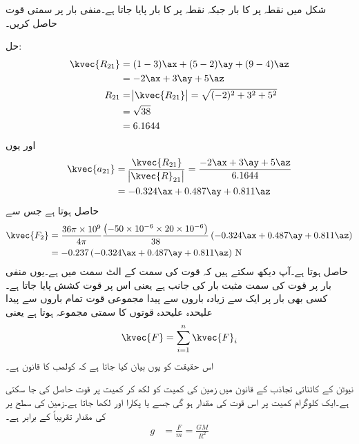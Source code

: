 شکل  میں نقطہ  پر  کا بار  جبکہ نقطہ  پر  کا بار  پایا جاتا ہے۔منفی بار  پر سمتی قوت حاصل کریں۔

حل:
\begin{align*}
\kvec{R_{21}}&=(1-3) \ax+(5-2) \ay+(9-4)\az\\
&=-2 \ax+3 \ay+5 \az\\
R_{21}&=\abs{\kvec{R_{21}}}=\sqrt{(-2)^2+3^2+5^2}\\
&=\sqrt{38}\\
&=6.1644
\end{align*}
اور یوں
\begin{align*}
\kvec{a_{21}}&=\frac{{\kvec{R_{21}}}}{\abs{\kvec{R}_{21}}}=\frac{-2 {\ax}+3 {\ay}+5 \az}{6.1644}\\
&=-0.324 \ax+0.487 \ay+0.811\az
\end{align*}
حاصل ہوتا ہے جس سے
\begin{align*}
\kvec{F_2}&=\frac{36 \pi  \times 10^9}{4 \pi} \frac{\left (-50\times 10^{-6} \times 20 \times 10^{-6} \right )}{38} \left(-0.324 \ax+0.487 \ay+0.811\az\right)\\
&=-0.237  \left(-0.324 \ax+0.487 \ay+0.811\az \right) \, \si{\newton}
\end{align*}
حاصل ہوتا ہے۔آپ دیکھ سکتے ہیں کہ قوت کی سمت  کے الٹ سمت میں ہے۔یوں منفی بار پر قوت کی سمت مثبت بار کی جانب ہے یعنی اس پر قوت کشش پایا جاتا ہے۔
کسی بھی بار پر ایک سے زیادہ باروں سے پیدا مجموعی قوت تمام باروں سے پیدا علیحدہ علیحدہ قوتوں کا سمتی مجموعہ ہوتا ہے یعنی
\begin{align}
\kvec{F}=\sum_{i=1}^n \kvec{F}_i
\end{align}
اس حقیقت کو یوں بیان کیا جاتا ہے کہ کولمب کا قانون  ہے۔ 

نیوٹن کے کائناتی تجاذب کے قانون میں زمین کی کمیت کو  لکھ کر کمیت  پر قوت  حاصل کی جا سکتی ہے۔ایک کلوگرام کمیت پر اس قوت کی مقدار  ہو گی جسے  یا  پکارا اور  لکھا جاتا ہے۔زمین کی سطح پر  کی مقدار تقریباً  کے برابر ہے۔
\begin{align}\label{مساوات_کولمب_زمین_کی_کشش}
g&=\frac{F}{m}=\frac{GM}{R^2}
\end{align}

